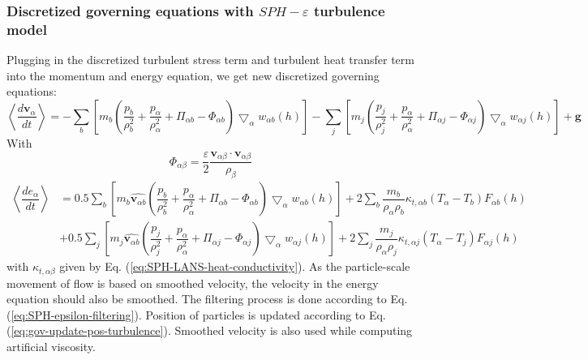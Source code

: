 \documentclass[journal abbreviation, manuscript]{copernicus}
\begin{document}
\subsubsection{Discretized governing equations with $SPH-\varepsilon$ turbulence model}
Plugging in the discretized turbulent stress term and turbulent heat transfer term into the momentum and energy equation, we get new discretized governing equations:
\begin{equation}
\left\langle\dfrac{d \textbf{v}_{\alpha}}{d t}\right\rangle= 
-\sum_b \left[ m_b \left(\dfrac{p_b}{\rho_b^2} + \dfrac{p_{\alpha}}{\rho_{\alpha}^2} + \Pi_{\alpha b} - \Phi_{\alpha b}\right) \bigtriangledown_{\alpha}w_{\alpha b}\left(h\right)\right]
-\sum_j \left[m_j \left(\dfrac{p_j}{\rho_j^2} + \dfrac{p_{\alpha}}{\rho_{\alpha}^2} + \Pi_{\alpha j} - \Phi_{\alpha j}\right) \bigtriangledown_{\alpha}w_{\alpha j}\left(h\right)\right]
+\textbf{g} \label{eq:gov-sph-v}
\end{equation}
With 
\begin{equation}
\Phi_{\alpha \beta}=\dfrac{\varepsilon}{2} \dfrac{\textbf{v}_{\alpha \beta} \cdot \textbf{v}_{\alpha \beta}} {\rho_{\beta}} 
\end{equation}
\begin{equation}
\begin{split}
\left\langle\dfrac{d e_{\alpha}}{d t}\right\rangle
& = 0.5\sum_b \left[m_b \widehat{\textbf{v}_{\alpha b}}\left(\dfrac{p_b}{\rho_b^2} + \dfrac{p_{\alpha}}{\rho_{\alpha}^2} + \Pi_{\alpha b} - \Phi_{\alpha b}\right) \bigtriangledown_{\alpha}w_{\alpha b}\left(h\right)\right] 
 + 2 \sum_b \dfrac{m_b}{\rho_{\alpha} \rho_b} \kappa_{t,\alpha b} \left(T_{\alpha} - T_b\right) F_{\alpha b} \left(h\right) \\
 & +0.5\sum_j \left[m_j \widehat{\textbf{v}_{\alpha b}}\left(\dfrac{p_j}{\rho_j^2} + \dfrac{p_{\alpha}}{\rho_{\alpha}^2} + \Pi_{\alpha j} - \Phi_{\alpha j}\right) \bigtriangledown_{\alpha}w_{\alpha j}\left(h\right)\right]
 + 2 \sum_j \dfrac{m_j}{\rho_{\alpha} \rho_j} \kappa_{t,\alpha j} \left(T_{\alpha} - T_j\right) F_{\alpha j} \left(h\right)
\end{split}
\label{eq:gov-sph-e}
\end{equation}
with $\kappa_{t,\alpha \beta}$ given by Eq. (\ref{eq:SPH-LANS-heat-conductivity}). 
As the particle-scale movement of flow is based on smoothed velocity, the velocity in the energy equation should also be smoothed.
The filtering process is done according to Eq. (\ref{eq:SPH-epsilon-filtering}). Position of particles is updated according to Eq. (\ref{eq:gov-update-pos-turbulence}). Smoothed velocity is also used while computing artificial viscosity.
\end{document}
